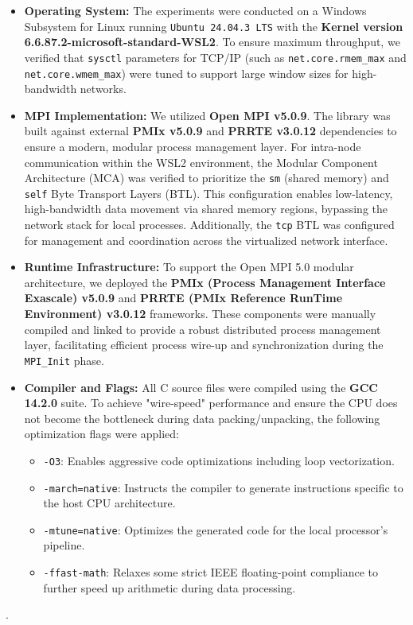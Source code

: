 \documentclass[11pt,a4paper]{article}
\begin{document}
	\begin{itemize} 
		\item \textbf{Operating System:} The experiments were conducted on a Windows Subsystem for Linux running \texttt{Ubuntu 24.04.3 LTS} with the \textbf{Kernel version 6.6.87.2-microsoft-standard-WSL2}. To ensure maximum throughput, we verified that \texttt{sysctl} parameters for TCP/IP (such as \texttt{net.core.rmem\_max} and \texttt{net.core.wmem\_max}) were tuned to support large window sizes for high-bandwidth networks.
		
		\item \textbf{MPI Implementation:} We utilized \textbf{Open MPI v5.0.9}. The library was built against external \textbf{PMIx v5.0.9} and \textbf{PRRTE v3.0.12} dependencies to ensure a modern, modular process management layer. For intra-node communication within the WSL2 environment, the Modular Component Architecture (MCA) was verified to prioritize the \texttt{sm} (shared memory) and \texttt{self} Byte Transport Layers (BTL). This configuration enables low-latency, high-bandwidth data movement via shared memory regions, bypassing the network stack for local processes. Additionally, the \texttt{tcp} BTL was configured for management and coordination across the virtualized network interface.
		
		\item \textbf{Runtime Infrastructure:} To support the Open MPI 5.0 modular architecture, we deployed the \textbf{PMIx (Process Management Interface Exascale) v5.0.9} and \textbf{PRRTE (PMIx Reference RunTime Environment) v3.0.12} frameworks. These components were manually compiled and linked to provide a robust distributed process management layer, facilitating efficient process wire-up and synchronization during the \texttt{MPI\_Init} phase.
		
		\item \textbf{Compiler and Flags:} All C source files were compiled using the \textbf{GCC 14.2.0} suite. To achieve "wire-speed" performance and ensure the CPU does not become the bottleneck during data packing/unpacking, the following optimization flags were applied:
		\begin{itemize}
			\item \texttt{-O3}: Enables aggressive code optimizations including loop vectorization.
			\item \texttt{-march=native}: Instructs the compiler to generate instructions specific to the host CPU architecture.
			\item \texttt{-mtune=native}: Optimizes the generated code for the local processor's pipeline.
			\item \texttt{-ffast-math}: Relaxes some strict IEEE floating-point compliance to further speed up arithmetic during data processing.
		\end{itemize}
	\end{itemize}
	.
\end{document}
